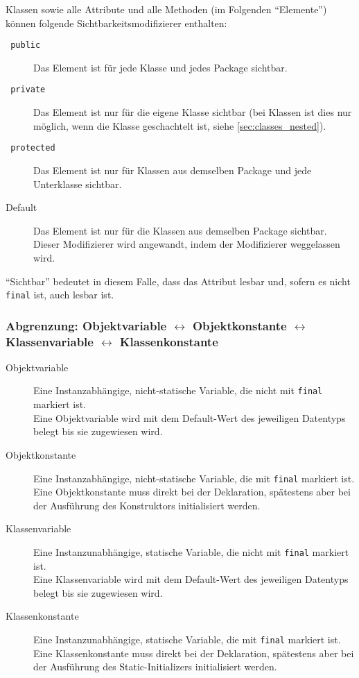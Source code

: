 		Klassen sowie alle Attribute und alle Methoden (im Folgenden \enquote{Elemente}) können folgende Sichtbarkeitsmodifizierer enthalten:
		\begin{description}
			\item[\texttt{\color{lstkeywords} public}] Das Element ist für jede Klasse und jedes Package sichtbar.
			\item[\texttt{\color{lstkeywords} private}] Das Element ist nur für die eigene Klasse sichtbar (bei Klassen ist dies nur möglich, wenn die Klasse geschachtelt ist, siehe \ref{sec:classes_nested}).
			\item[\texttt{\color{lstkeywords} protected}] Das Element ist nur für Klassen aus demselben Package und jede Unterklasse sichtbar.
			\item[Default] Das Element ist nur für die Klassen aus demselben Package sichtbar. Dieser Modifizierer wird angewandt, indem der Modifizierer weggelassen wird.
		\end{description}
		\enquote{Sichtbar} bedeutet in diesem Falle, dass das Attribut lesbar und, sofern es nicht \lstinline|final| ist, auch lesbar ist.
	
	\subsubsection{Abgrenzung: Objektvariable \(\leftrightarrow\) Objektkonstante \(\leftrightarrow\) Klassenvariable \(\leftrightarrow\) Klassenkonstante}
		\begin{description}
			\item[Objektvariable] Eine Instanzabhängige, nicht-statische Variable, die nicht mit \lstinline|final| markiert ist. \\ Eine Objektvariable wird mit dem Default-Wert des jeweiligen Datentyps belegt bis sie zugewiesen wird.
			\item[Objektkonstante] Eine Instanzabhängige, nicht-statische Variable, die mit \lstinline|final| markiert ist. \\ Eine Objektkonstante muss direkt bei der Deklaration, spätestens aber bei der Ausführung des Konstruktors initialisiert werden.
			\item[Klassenvariable] Eine Instanzunabhängige, statische Variable, die nicht mit \lstinline|final| markiert ist. \\ Eine Klassenvariable wird mit dem Default-Wert des jeweiligen Datentyps belegt bis sie zugewiesen wird.
			\item[Klassenkonstante] Eine Instanzunabhängige, statische Variable, die mit \lstinline|final| markiert ist. \\ Eine Klassenkonstante muss direkt bei der Deklaration, spätestens aber bei der Ausführung des Static-Initializers initialisiert werden.
		\end{description}

